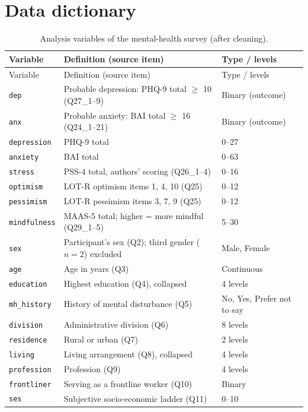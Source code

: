 \chapter{Data dictionary}\label{app:dict}

\begin{longtable}{@{}p{3.1cm}p{7.4cm}p{3.6cm}@{}}
\caption{Analysis variables of the mental-health survey (after cleaning).}\label{tab:dict}\\
\toprule
Variable & Definition (source item) & Type / levels \\
\midrule\endfirsthead
\toprule Variable & Definition (source item) & Type / levels \\ \midrule\endhead
\bottomrule\endfoot
\texttt{dep} & Probable depression: PHQ-9 total $\geq$ 10 (Q27\_1--9) & Binary (outcome) \\
\texttt{anx} & Probable anxiety: BAI total $\geq$ 16 (Q24\_1--21) & Binary (outcome) \\
\texttt{depression} & PHQ-9 total & 0--27 \\
\texttt{anxiety} & BAI total & 0--63 \\
\texttt{stress} & PSS-4 total, authors' scoring (Q26\_1--4) & 0--16 \\
\texttt{optimism} & LOT-R optimism items 1, 4, 10 (Q25) & 0--12 \\
\texttt{pessimism} & LOT-R pessimism items 3, 7, 9 (Q25) & 0--12 \\
\texttt{mindfulness} & MAAS-5 total; higher = more mindful (Q29\_1--5) & 5--30 \\
\texttt{sex} & Participant's sex (Q2); third gender ($n=2$) excluded & Male, Female \\
\texttt{age} & Age in years (Q3) & Continuous \\
\texttt{education} & Highest education (Q4), collapsed & 4 levels \\
\texttt{mh\_history} & History of mental disturbance (Q5) & No, Yes, Prefer not to say \\
\texttt{division} & Administrative division (Q6) & 8 levels \\
\texttt{residence} & Rural or urban (Q7) & 2 levels \\
\texttt{living} & Living arrangement (Q8), collapsed & 4 levels \\
\texttt{profession} & Profession (Q9) & 4 levels \\
\texttt{frontliner} & Serving as a frontline worker (Q10) & Binary \\
\texttt{ses} & Subjective socio-economic ladder (Q11) & 0--10 \\

\end{longtable}
